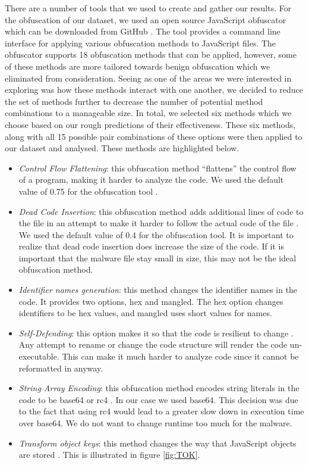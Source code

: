 \documentclass[sigplan,10pt,review, nonacm=true]{acmart}\settopmatter{printfolios=true,printccs=false,printacmref=false}
\begin{document}
There are a number of tools that we used to create and gather our results. For the obfuscation of our dataset, we used an open source JavaScript obfuscator which can be downloaded from GitHub \cite{Obfuscator}. The tool provides a command line interface for applying various obfuscation methods to JavaScript files. The obfuscator supports 18 obfuscation methods that can be applied, however, some of these methods are more tailored towards benign obfuscation which we eliminated from consideration. Seeing as one of the areas we were interested in exploring was how these methods interact with one another, we decided to reduce the set of methods further to decrease the number of potential method combinations to a manageable size. In total, we selected six methods which we choose based on our rough predictions of their effectiveness. These six methods, along with all 15 possible pair combinations of these options were then applied to our dataset and analysed.  These methods are highlighted below.

\begin{itemize}
    \item \textit{Control Flow Flattening}: this obfuscation method “flattens” the control flow of a program, making it harder to analyze the code. We used the default value of 0.75 for the obfuscation tool \cite{Obfuscator}.
    \item \textit{Dead Code Insertion}: this obfuscation method adds additional lines of code to the file in an attempt to make it harder to follow the actual code of the file \cite{Obfuscator}. We used the default value of 0.4 for the obfuscation tool. It is important to realize that dead code insertion does increase the size of the code. If it is important that the malware file stay small in size, this may not be the ideal obfuscation method.
    \item \textit{Identifier names generation}: this method changes the identifier names in the code. It provides two options, hex and mangled. The hex option changes identifiers to be hex values, and mangled uses short values for names. \cite{Obfuscator}
    \item \textit{Self-Defending}: this option makes it so that the code is resilient to change \cite{Obfuscator}. Any attempt to rename or change the code structure will render the code un-executable. This can make it much harder to analyze code since it cannot be reformatted in anyway.
    \item \textit{String Array Encoding}: this obfuscation method encodes string literals in the code to be base64 or rc4 \cite{Obfuscator}. In our case we used base64. This decision was due to the fact that using rc4 would lead to a greater slow down in execution time over base64. We do not want to change runtime too much for the malware.
    \item \textit{Transform object keys}: this method changes the way that JavaScript objects are stored \cite{Obfuscator}. This is illustrated in figure \ref{fig:TOK}.
\end{itemize}
\end{document}
